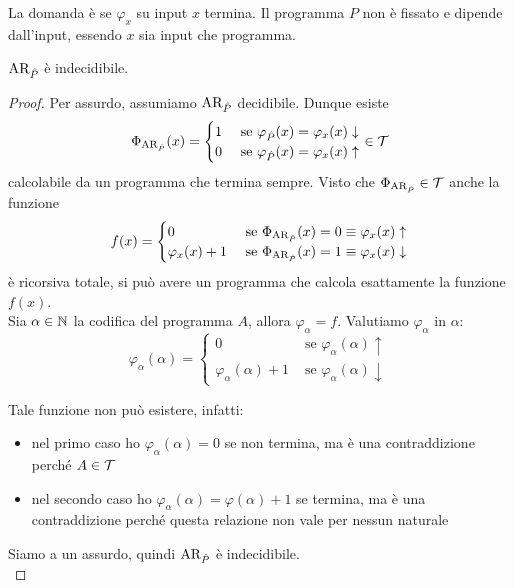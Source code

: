 La domanda è se $\varphi_x$ su input $x$ termina. Il programma $P$ non è fissato e dipende dall'input, essendo $x$ sia input che programma.\\

\begin{theor}
	$\text{AR}_{\hat{P}}$ è indecidibile.
\end{theor}
\begin{proof}
	Per assurdo, assumiamo $\text{AR}_{\hat{P}}$ decidibile. Dunque esiste
	$$
	\Phi_{\text{AR}_{\hat{P}}} (x) = \begin{cases}
		1 & \text{ se } \varphi_{\hat{P}} (x) = \varphi_x (x) \downarrow \\
		0 & \text{ se } \varphi_{\hat{P}} (x) = \varphi_x (x) \uparrow \\
	\end{cases}
	\in \mathcal{T} 
	$$
	calcolabile da un programma che termina sempre. Visto che $\Phi_{\text{AR}_{\hat{P}}} \in \mathcal{T}$ anche la funzione
	$$ 
	f(x) = \begin{cases}
		0 & \text{ se } \Phi_{\text{AR}_{\hat{P}}} (x) = 0 \equiv \varphi_x (x) \uparrow \\
		\varphi_x (x) + 1 & \text{ se } \Phi_{\text{AR}_{\hat{P}}} (x) = 1 \equiv \varphi_x (x) \downarrow
	\end{cases}
	$$
	è ricorsiva totale, si può avere un programma che calcola esattamente la funzione $f(x)$. \\
	
	Sia $\alpha \in \mathbb{N}$ la codifica del programma $A$, allora $\varphi_\alpha = f$. Valutiamo $\varphi_\alpha$ in $\alpha$:
	$$ 
	\varphi_\alpha (\alpha) = \begin{cases}
		0 & \text{ se } \varphi_\alpha (\alpha) \uparrow \\
		\varphi_\alpha (\alpha) + 1 & \text{ se } \varphi_\alpha(\alpha) \downarrow
	\end{cases}
	$$
	
	Tale funzione non può esistere, infatti: 
	\begin{itemize}
		\item nel primo caso ho $\varphi_\alpha (\alpha) = 0$ se non termina, ma è una contraddizione perché $A \in \mathcal{T}$
		\item nel secondo caso ho $\varphi_\alpha (\alpha) = \varphi(\alpha) + 1$ se termina, ma è una contraddizione perché questa relazione non vale per nessun naturale
	\end{itemize}
	
	Siamo a un assurdo, quindi $\text{AR}_{\hat{P}}$ è indecidibile.\\
\end{proof}

